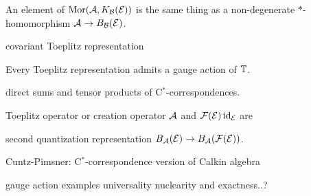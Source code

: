 \documentclass{../../../small}
\begin{document}
An element of $\operatorname{Mor}(\mathcal{A},K_{\mathcal{B}}(\mathcal{E}))$ is the same thing as a non-degenerate $*$-homomorphism $\mathcal{A}\to B_{\mathcal{B}}(\mathcal{E})$.

covariant Toeplitz representation

Every Toeplitz representation admits a gauge action of $\mathbb{T}$.


direct sums and tensor products of C$^*$-correspondences.

\begin{defn}
Toeplitz operator or creation operator
$\mathcal{A}$ and $\mathcal{F}(\mathcal{E})\operatorname{id}_{\mathcal{E}}$ are
\end{defn}

second quantization representation $B_{\mathcal{A}}(\mathcal{E})\to B_{\mathcal{A}}(\mathcal{F}(\mathcal{E}))$.


Cuntz-Pimsner: C$^*$-correspondence version of Calkin algebra



gauge action
examples
universality
nuclearity and exactness..?
\end{document}
